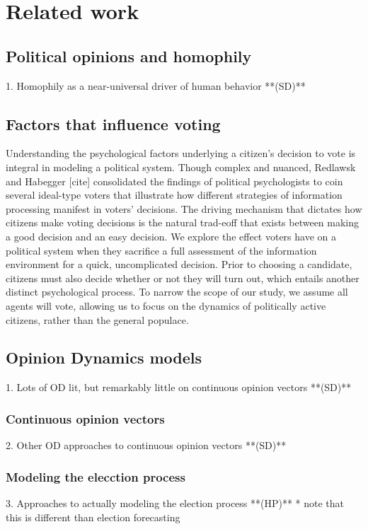 \section{Related work}
\label{sec:related}

\subsection{Political opinions and homophily}
    1. Homophily as a near-universal driver of human behavior **(SD)**

\subsection{Factors that influence voting}
Understanding the psychological factors underlying a citizen’s decision to vote 
is integral in modeling a political system. Though complex and nuanced, Redlawsk 
and Habegger [cite] consolidated the findings of political psychologists to coin 
several ideal-type voters that illustrate how different strategies of information 
processing manifest in voters’ decisions. The driving mechanism that dictates how 
citizens make voting decisions is the natural trad-eoff that exists between making 
a good decision and an easy decision. We explore the effect voters have on a political 
system when they sacrifice a full assessment of the information environment for a 
quick, uncomplicated decision. Prior to choosing a candidate, citizens must also 
decide whether or not they will turn out, which entails another distinct psychological 
process. To narrow the scope of our study, we assume all agents will vote, allowing 
us to focus on the dynamics of politically active citizens, rather than the general 
populace.

\subsection{Opinion Dynamics models}
    1. Lots of OD lit, but remarkably little on continuous opinion vectors **(SD)**

\subsubsection{Continuous opinion vectors}
    2. Other OD approaches to continuous opinion vectors **(SD)**

\subsubsection{Modeling the elecction process}
    3. Approaches to actually modeling the election process **(HP)**
        * note that this is different than election forecasting


